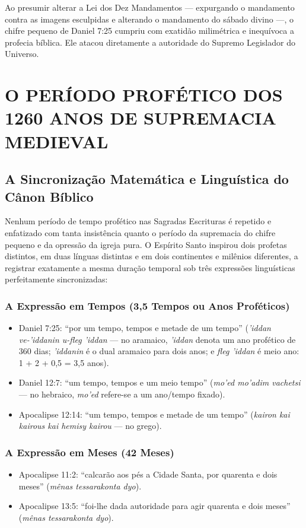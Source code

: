 Ao presumir alterar a Lei dos Dez Mandamentos — expurgando o mandamento contra as imagens esculpidas e alterando o mandamento do sábado divino —, o chifre pequeno de Daniel 7:25 cumpriu com exatidão milimétrica e inequívoca a profecia bíblica. Ele atacou diretamente a autoridade do Supremo Legislador do Universo.



\section{O PERÍODO PROFÉTICO DOS 1260 ANOS DE SUPREMACIA MEDIEVAL}



\subsection{A Sincronização Matemática e Linguística do Cânon Bíblico}


Nenhum período de tempo profético nas Sagradas Escrituras é repetido e enfatizado com tanta insistência quanto o período da supremacia do chifre pequeno e da opressão da igreja pura. O Espírito Santo inspirou dois profetas distintos, em duas línguas distintas e em dois continentes e milênios diferentes, a registrar exatamente a mesma duração temporal sob três expressões linguísticas perfeitamente sincronizadas:


\subsubsection*{A Expressão em Tempos (3,5 Tempos ou Anos Proféticos)}
\begin{itemize}
  \item Daniel 7:25: ``por um tempo, tempos e metade de um tempo'' (\textit{'iddan ve-'iddanin u-fleg 'iddan} — no aramaico, \textit{'iddan} denota um ano profético de 360 dias; \textit{'iddanin} é o dual aramaico para dois anos; e \textit{fleg 'iddan} é meio ano: 1 + 2 + 0,5 = 3,5 anos).
  \item Daniel 12:7: ``um tempo, tempos e um meio tempo'' (\textit{mo'ed mo'adim vachetsi} — no hebraico, \textit{mo'ed} refere-se a um ano/tempo fixado).
  \item Apocalipse 12:14: ``um tempo, tempos e metade de um tempo'' (\textit{kairon kai kairous kai hemisy kairou} — no grego).
\end{itemize}



\subsubsection*{A Expressão em Meses (42 Meses)}
\begin{itemize}
  \item Apocalipse 11:2: ``calcarão aos pés a Cidade Santa, por quarenta e dois meses'' (\textit{mênas tessarakonta dyo}).
  \item Apocalipse 13:5: ``foi-lhe dada autoridade para agir quarenta e dois meses'' (\textit{mênas tessarakonta dyo}).
\end{itemize}



